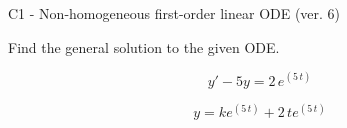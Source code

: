 \begin{exercise}
  \begin{exerciseTitle}C1 - Non-homogeneous first-order linear ODE (ver. 6)\end{exerciseTitle}
  \begin{exerciseStatement}
    
Find the general solution to the given ODE.

    
\[y'-5y= 2 \, e^{\left(5 \, t\right)}\]

  \end{exerciseStatement}
  \begin{exerciseAnswer}
    
\[y= k e^{\left(5 \, t\right)} + 2 \, t e^{\left(5 \, t\right)}\]

  \end{exerciseAnswer}
\end{exercise}
